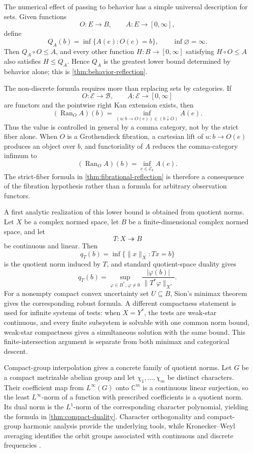 \documentclass[12pt,a4paper,twoside]{extarticle}
\theoremstyle{compactplain}
\theoremstyle{compactdef}
\newcommand{\Ran}{\operatorname{Ran}}
\begin{document}
The numerical effect of passing to behavior has a simple universal description
for sets.  Given functions
\[
  O:E\longrightarrow B,
  \qquad
  A:E\longrightarrow[0,\infty],
\]
define
\[
  Q_A(b)=\inf\{A(e):O(e)=b\},
  \qquad \inf\varnothing=\infty.
\]
Then \(Q_A\circ O\leq A\), and every other function
\(H:B\to[0,\infty]\) satisfying \(H\circ O\leq A\) also satisfies
\(H\leq Q_A\).  Hence \(Q_A\) is the greatest lower bound determined by
behavior alone; this is \cref{thm:behavior-reflection}.

The non-discrete formula requires more than replacing sets by categories.  If
\[
  O:\mathcal E\longrightarrow\mathcal B,
  \qquad
  A:\mathcal E\longrightarrow[0,\infty]
\]
are functors and the pointwise right Kan extension exists, then
\[
  (\Ran_OA)(b)
  =
  \inf_{(u:b\to O(e))\in(b\downarrow O)} A(e).
\]
Thus the value is controlled in general by a comma category, not by the strict
fiber alone.  When \(O\) is a Grothendieck fibration, a cartesian lift of
\(u:b\to O(e)\) produces an object over \(b\), and functoriality of \(A\)
reduces the comma-category infimum to
\[
  (\Ran_OA)(b)=\inf_{e\in\mathcal E_b}A(e).
\]
The strict-fiber formula in \cref{thm:fibrational-reflection} is therefore a
consequence of the fibration hypothesis rather than a formula for arbitrary
observation functors.

A first analytic realization of this lower bound is obtained from quotient
norms.  Let \(X\) be a complex normed space, let \(B\) be a
finite-dimensional complex normed space, and let
\[
  T:X\twoheadrightarrow B
\]
be continuous and linear.  Then
\[
  q_T(b)=\inf\{\|x\|_X:Tx=b\}
\]
is the quotient norm induced by \(T\), and standard quotient-space duality
\cite{conway,folland} gives
\[
  q_T(b)
  =
  \sup_{\varphi\in B^*,\,\varphi\ne0}
  \frac{|\varphi(b)|}{\|T^*\varphi\|_{X^*}}.
\]
For a nonempty compact convex uncertainty set \(U\subseteq B\), Sion's minimax
theorem \cite{sion} gives the corresponding robust formula.  A different
compactness statement is used for infinite systems of tests: when
\(X=Y^*\), the tests are weak-star continuous, and every finite subsystem is
solvable with one common norm bound, weak-star compactness gives a simultaneous
solution with the same bound.  This finite-intersection argument is separate
from both minimax and categorical descent.

Compact-group interpolation gives a concrete family of quotient norms.  Let
\(G\) be a compact metrizable abelian group and let
\(\chi_1,\ldots,\chi_m\) be distinct characters.  Their coefficient map
from \(L^\infty(G)\) onto \(\mathbb C^m\) is a continuous linear
surjection, so the least \(L^\infty\)-norm of a function with prescribed
coefficients is a quotient norm.  Its dual norm is the \(L^1\)-norm of the
corresponding character polynomial, yielding the formula in
\cref{thm:compact-duality}.  Character orthogonality and compact-group harmonic
analysis provide the underlying tools, while Kronecker--Weyl averaging
identifies the orbit groups associated with continuous and discrete
frequencies \cite{bailleul,rudin,katznelson}.
\end{document}
